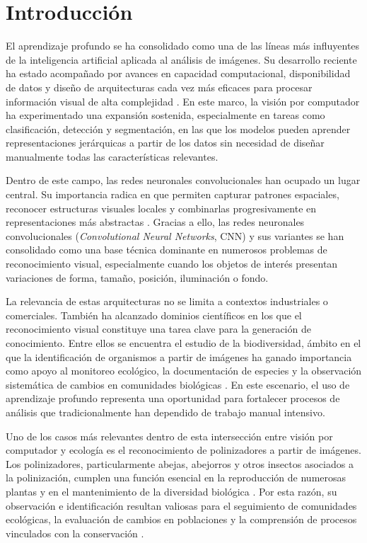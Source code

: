 \chapter{Introducción}


El aprendizaje profundo se ha consolidado como una de las líneas más influyentes de la inteligencia artificial aplicada al análisis de imágenes. Su desarrollo reciente ha estado acompañado por avances en capacidad computacional, disponibilidad de datos y diseño de arquitecturas cada vez más eficaces para procesar información visual de alta complejidad \parencite{herath2025evolution,mienie2024review}. En este marco, la visión por computador ha experimentado una expansión sostenida, especialmente en tareas como clasificación, detección y segmentación, en las que los modelos pueden aprender representaciones jerárquicas a partir de los datos sin necesidad de diseñar manualmente todas las características relevantes.

Dentro de este campo, las redes neuronales convolucionales han ocupado un lugar central. Su importancia radica en que permiten capturar patrones espaciales, reconocer estructuras visuales locales y combinarlas progresivamente en representaciones más abstractas \parencite{khan2020survey,raj2025cnn}. Gracias a ello, las redes neuronales convolucionales (\textit{Convolutional Neural Networks}, CNN) y sus variantes se han consolidado como una base técnica dominante en numerosos problemas de reconocimiento visual, especialmente cuando los objetos de interés presentan variaciones de forma, tamaño, posición, iluminación o fondo.

La relevancia de estas arquitecturas no se limita a contextos industriales o comerciales. También ha alcanzado dominios científicos en los que el reconocimiento visual constituye una tarea clave para la generación de conocimiento. Entre ellos se encuentra el estudio de la biodiversidad, ámbito en el que la identificación de organismos a partir de imágenes ha ganado importancia como apoyo al monitoreo ecológico, la documentación de especies y la observación sistemática de cambios en comunidades biológicas \parencite{borowiec2022deep,hoye2021entomology}. En este escenario, el uso de aprendizaje profundo representa una oportunidad para fortalecer procesos de análisis que tradicionalmente han dependido de trabajo manual intensivo.

Uno de los casos más relevantes dentro de esta intersección entre visión por computador y ecología es el reconocimiento de polinizadores a partir de imágenes. Los polinizadores, particularmente abejas, abejorros y otros insectos asociados a la polinización, cumplen una función esencial en la reproducción de numerosas plantas y en el mantenimiento de la diversidad biológica \parencite{ghosh2025pollinator}. Por esta razón, su observación e identificación resultan valiosas para el seguimiento de comunidades ecológicas, la evaluación de cambios en poblaciones y la comprensión de procesos vinculados con la conservación \parencite{hellwig2024pollinator}.


